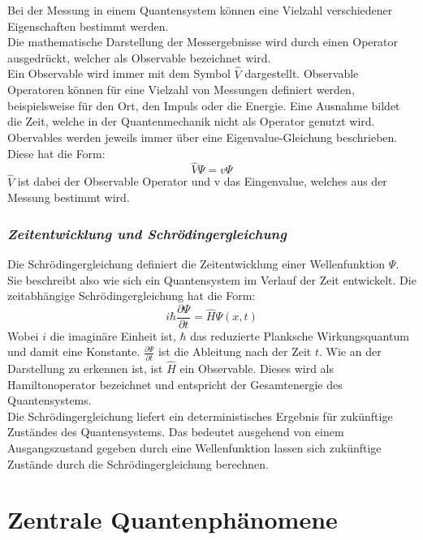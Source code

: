 Bei der Messung in einem Quantensystem können eine Vielzahl verschiedener Eigenschaften bestimmt werden.\\
Die mathematische Darstellung der Messergebnisse  wird  durch einen Operator ausgedrückt, welcher als Observable bezeichnet wird.\\
Ein Observable wird immer mit dem Symbol $\hat{V}$ dargestellt.
Observable Operatoren können für eine Vielzahl von Messungen definiert werden, beispielsweise für den Ort, den Impuls oder die Energie. Eine Ausnahme bildet die Zeit, welche in der Quantenmechanik nicht als Operator genutzt wird.\\
Obervables werden jeweils immer über eine Eigenvalue-Gleichung beschrieben. Diese hat die Form:
\begin{equation*}
\hat{V} \Psi = v \Psi
\end{equation*}
$\hat{V}$ ist dabei der Observable Operator und v das Eingenvalue, welches aus der Messung bestimmt wird.

\subsubsection*{\textit{Zeitentwicklung und Schrödingergleichung}}

Die Schrödingergleichung definiert die Zeitentwicklung einer Wellenfunktion $\Psi$. Sie beschreibt also wie sich ein Quantensystem im Verlauf der Zeit entwickelt. Die zeitabhängige Schrödingergleichung hat die Form:
\begin{equation*}
i\hbar \frac{\partial \Psi}{\partial t} = \hat{H} \Psi(x,t)
\end{equation*}
Wobei $i$ die imaginäre Einheit ist, $\hbar$ das reduzierte Planksche Wirkungsquantum und damit eine Konstante. $\frac{\partial \Psi}{\partial t}$ ist die Ableitung nach der Zeit $t$. Wie an der Darstellung zu erkennen ist, ist $\hat{H}$ ein Observable. Dieses wird als Hamiltonoperator bezeichnet und entspricht der Gesamtenergie des Quantensystems.\\
Die Schrödingergleichung liefert ein deterministisches Ergebnis für zukünftige Zuständes des Quantensystems. Das bedeutet ausgehend von einem Ausgangszustand gegeben durch eine Wellenfunktion lassen sich zukünftige Zustände durch die Schrödingergleichung berechnen.

\section{Zentrale Quantenphänomene }

